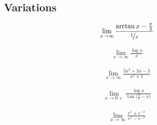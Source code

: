 \subsection{Variations}\label{ssec_3_7_2}
\begin{eg}\label{eg:hopitalH}
\begin{align*}
\lim_{x\to\infty} \frac{\arctan x - \frac{\pi}{2}}{ \nicefrac{1}{x} }
\end{align*}
\end{eg}
\begin{eg}\label{eg_3_7_2}
\begin{align*}
\lim_{x \to \infty} \frac{\log x}{x}
\end{align*}
\end{eg}
\begin{eg}\label{eg_3_7_3}
\begin{align*}
\lim_{x \to \infty} \frac{5x^2+3x-3}{x^2+1}
\end{align*}
\end{eg}
\begin{eg}\label{eg:hopitalI}
\begin{align*}
\lim_{x\rightarrow 0+} \frac{\log x}{\tan\big(\frac{\pi}{2}-x\big)}
\end{align*}
\end{eg}
\begin{eg}\label{eg_3_7_4}
\begin{align*}
\lim_{x\to\infty} \frac{ e^x + e^{-x} }{e^x - e^{-x}}
\end{align*}
\end{eg}

